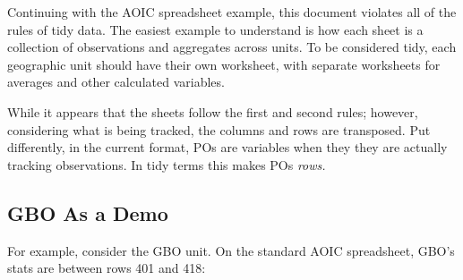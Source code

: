 \documentclass[12pt,]{article}
\begin{document}
Continuing with the AOIC spreadsheet example, this document violates all
of the rules of tidy data. The easiest example to understand is how each
sheet is a collection of observations and aggregates across units. To be
considered tidy, each geographic unit should have their own worksheet,
with separate worksheets for averages and other calculated variables.

While it appears that the sheets follow the first and second rules;
however, considering what is being tracked, the columns and rows are
transposed. Put differently, in the current format, POs are variables
when they they are actually tracking observations. In tidy terms this
makes POs \emph{rows.}

\hypertarget{gbo-as-a-demo}{%
\subsection{GBO As a Demo}\label{gbo-as-a-demo}}

For example, consider the GBO unit. On the standard AOIC spreadsheet,
GBO's stats are between rows 401 and 418:
\end{document}
